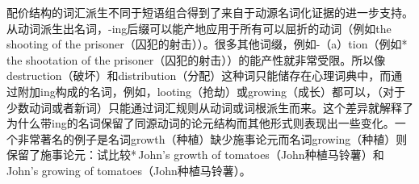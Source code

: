     配价结构的词汇派生不同于短语组合得到了来自于动源名词化证据的进一步支持\citep{Wechsler2008a}。从动词派生出名词，-ing后缀可以能产地应用于所有可以屈折的动词（例如the shooting of the prisoner（囚犯的射击））。很多其他词缀，例如-（a）tion（例如*\,the shootation of the prisoner（囚犯的射击））的能产性就非常受限。所以像destruction（破坏）和distribution（分配）这种词只能储存在心理词典中，而通过附加ing构成的名词，例如，looting（抢劫）或growing（成长）都可以，（对于少数动词或者新词）只能通过词汇规则从动词或词根派生而来\citep{Zucchi93a-u}。这个差异就解释了为什么带ing的名词保留了同源动词的论元结构而其他形式则表现出一些变化。一个非常著名的例子是名词growth（种植）缺少施事论元而名词growing（种植）则保留了施事论元：试比较*\,John's growth of tomatoes（John种植马铃薯）和John's growing of tomatoes（John种植马铃薯）\citep{Chomsky70a}。 


